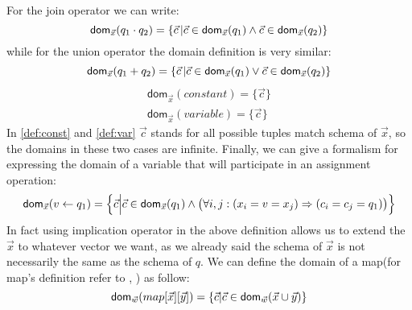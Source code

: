 \documentclass[12pt]{article}
\newcommand{\dom}{\textsf{dom}}
\begin{document}
For the join operator we can write:
\begin{equation}
\label{def:join}
\text{\dom{}}_{\vec{x}}(q_{1}\cdot q_{2})=\{\vec{c}\,|\vec{c}\in\text{\dom{}}_{\vec{x}}(q_{1})\land\vec{c}\in\text{\dom{}}_{\vec{x}}(q_{2})\}
\end{equation}
while for the union operator the domain definition is very similar:
\begin{equation}
\label{def:plus}
\text{\dom{}}_{\vec{x}}(q_{1}+ q_{2})=\{\vec{c}\,|\vec{c}\in\text{\dom{}}_{\vec{x}}(q_{1})\lor\vec{c}\in\text{\dom{}}_{\vec{x}}(q_{2})\}
\end{equation}
\begin{eqnarray}
\dom{}_{\vec x}(constant)=\Big\{\vec c\Big\}\label{def:const}\\
\dom{}_{\vec x}(variable)=\Big\{\vec c\Big\}\label{def:var}
\end{eqnarray}
In \eqref{def:const} and \eqref{def:var}  $\vec{c}$ stands for all possible tuples match schema of $\vec{x}$, so the domains in these two cases are infinite. 
Finally, we can give a formalism for expressing the domain of a variable that will participate in an assignment operation:
\begin{equation}
\label{assign2}
\text{\dom{}}_{\vec{x}}(v\gets q_{1})=\Big\{\vec{c}\Big|\vec{c}\in\text{\dom{}}_{\vec{x}}(q_{1})\land \big(\forall i,j: (x_{i}=v=x_{j})\Rightarrow(c_{i}=c_{j}=q_{1})\big)\Big\}
\end{equation}
In fact using implication operator in the above definition allows us to extend the $\vec{x}$ to whatever vector we want, as we already said the schema of $\vec{x}$ is not necessarily the same as the schema of $q$. %
We can define the domain of a map(for map's definition refer to \cite{1}, \cite{2}) as follow:
\begin{equation}
\label{def:map}
\text{\dom}_{\vec{w}}(map[\vec{x}][\vec{y}])=\{\vec{c}|\vec{c}\in\text{\dom}_{\vec{w}}(\vec{x}\cup\vec{y})\}
\end{equation}
\end{document}
